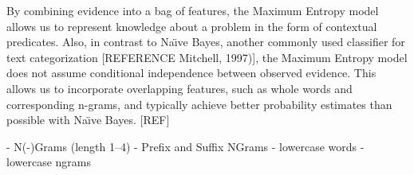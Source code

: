 By combining evidence into a bag of features, the Maximum Entropy model allows us to represent knowledge about a problem in the form of contextual predicates. Also, in contrast to Na\"{\i}ve Bayes, another commonly used classifier for text categorization [REFERENCE Mitchell, 1997)], the Maximum Entropy model does not assume conditional independence between observed evidence. This allows us to incorporate overlapping features, such as whole words and corresponding n-grams, and typically achieve better probability estimates than possible with Na\"{\i}ve Bayes. [REF]

	- N(-)Grams (length 1--4)
	- Prefix and Suffix NGrams
	- lowercase words
	- lowercase ngrams

